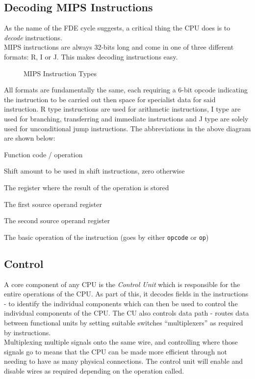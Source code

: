 \subsection{Decoding MIPS Instructions}
As the name of the FDE cycle suggests, a critical thing the CPU does is to \textit{decode} instructions.\\

MIPS instructions are always 32-bits long and come in one of three different formats: R, I or J. This makes decoding instructions easy. 
\begin{figure}[H]
    \centering
    
    \caption{MIPS Instruction Types}
\end{figure}

All formats are fundamentally the same, each requiring a 6-bit opcode indicating the instruction to be carried out then space for specialist data for said instruction. R type instructions are used for arithmetic instructions, I type are used for branching, transferring and immediate instructions and J type are solely used for unconditional jump instructions. The abbreviations in the above diagram are shown below:
\begin{description}[font=\ttfamily]
    \item[funct] Function code / operation
    \item[shamt] Shift amount to be used in shift instructions, zero otherwise
    \item[rd] The register where the result of the operation is stored
    \item[rs] The first source operand register
    \item[rt] The second source operand register
    \item[opcode (op)] The basic operation of the instruction (goes by either \verb|opcode| or \verb|op|)
\end{description}

\subsection{Control}
A core component of any CPU is the \textit{Control Unit} which is responsible for the entire operations of the CPU. As part of this, it decodes fields in the instructions - to identify the individual components which can then be used to control the individual components of the CPU. The CU also controls data path - routes data between functional units by setting suitable switches ``multiplexers'' as required by instructions.\\

Multiplexing multiple signals onto the same wire, and controlling where those signals go to means that the CPU can be made more efficient through not needing to have as many physical connections. The control unit will enable and disable wires as required depending on the operation called.
